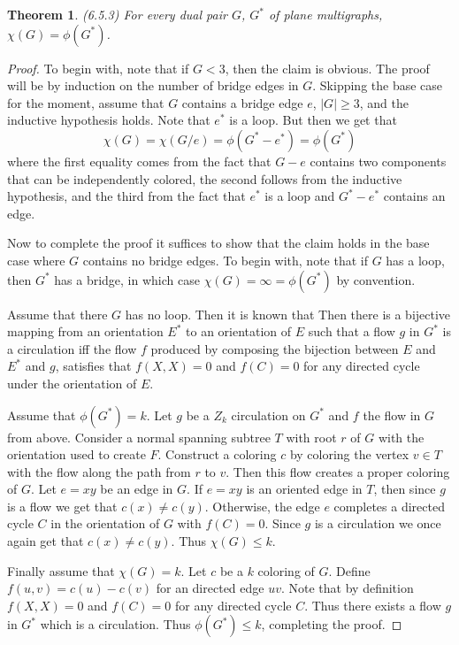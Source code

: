 \documentclass[12pt]{article}
\newtheorem{theorem}{Theorem}
\begin{document}
\begin{theorem} (6.5.3) For every dual pair $G$, $G^*$ of plane
  multigraphs, $\chi(G) = \phi(G^*)$.
\end{theorem}
\begin{proof} To begin with, note that if $G < 3$, then the claim is
  obvious. The proof will be by induction on the number of bridge
  edges in $G$. Skipping the base case for the moment, assume that $G$
  contains a bridge edge $e$, $|G| \geq 3$, and the inductive
  hypothesis holds. Note that $e^*$ is a loop. But then we get that
  \[
    \chi(G) = \chi(G/e) = \phi(G^* - e^*) = \phi(G^*)
  \]
  where the first equality comes from the fact that $G - e$ contains
  two components that can be independently colored, the second follows
  from the inductive hypothesis, and the third from the fact that
  $e^*$ is a loop and $G^* - e^*$ contains an edge.

  Now to complete the proof it suffices to show that the claim holds
  in the base case where $G$ contains no bridge edges. To begin with,
  note that if $G$ has a loop, then $G^*$ has a bridge, in which case
  $\chi(G) = \infty = \phi(G^*)$ by convention.

  Assume that there $G$ has no loop. Then it is known that Then there
  is a bijective mapping from an orientation $E^*$ to an orientation
  of $E$ such that a flow $g$ in $G^*$ is a circulation iff the flow
  $f$ produced by composing the bijection between $E$ and $E^*$ and
  $g$, satisfies that $f(X,X) = 0$ and $f(C) = 0$ for any directed
  cycle under the orientation of $E$.

  Assume that $\phi(G^*) = k$. Let $g$ be a $Z_k$ circulation on $G^*$
  and $f$ the flow in $G$ from above. Consider a normal spanning
  subtree $T$ with root $r$ of $G$ with the orientation used to create
  $F$. Construct a coloring $c$ by coloring the vertex $v \in T$ with
  the flow along the path from $r$ to $v$. Then this flow creates a
  proper coloring of $G$. Let $e = xy$ be an edge in $G$. If $e = xy$
  is an oriented edge in $T$, then since $g$ is a flow we get that
  $c(x) \neq c(y)$. Otherwise, the edge $e$ completes a directed cycle
  $C$ in the orientation of $G$ with $f(C) = 0$. Since $g$ is a
  circulation we once again get that $c(x) \neq c(y)$. Thus
  $\chi(G) \leq k$.

  Finally assume that $\chi(G) = k$. Let $c$ be a $k$ coloring of
  $G$. Define $f(u,v) = c(u) - c(v)$ for an directed edge $uv$. Note
  that by definition $f(X,X) = 0$ and $f(C) = 0$ for any directed
  cycle $C$. Thus there exists a flow $g$ in $G^*$ which is a
  circulation. Thus $\phi(G^*) \leq k$, completing the proof.
\end{proof}
\end{document}

